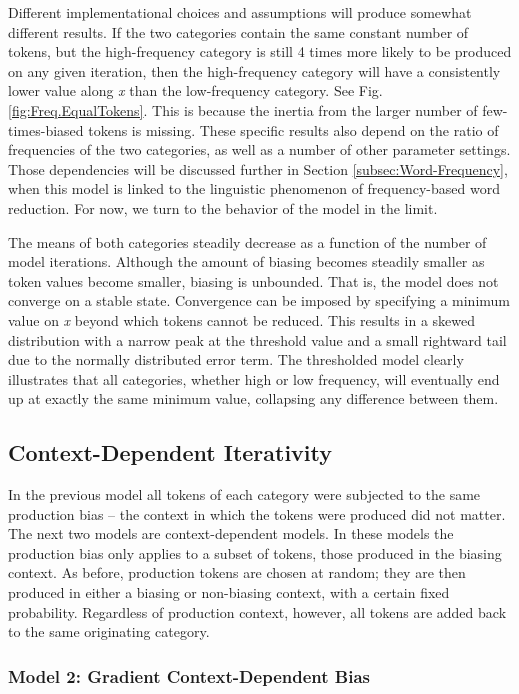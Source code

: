 Different implementational choices and assumptions will produce somewhat
different results. If the two categories contain the same constant
number of tokens, but the high-frequency category is still 4 times
more likely to be produced on any given iteration, then the high-frequency
category will have a consistently lower value along \emph{x} than
the low-frequency category. See Fig. \ref{fig:Freq.EqualTokens}.
This is because the inertia from the larger number of few-times-biased
tokens is missing. These specific results also depend on the ratio
of frequencies of the two categories, as well as a number of other
parameter settings. Those dependencies will be discussed further in
Section \ref{subsec:Word-Frequency}, when this model is linked to
the linguistic phenomenon of frequency-based word reduction. For now,
we turn to the behavior of the model in the limit.

The means of both categories steadily decrease as a function of the
number of model iterations. Although the amount of biasing becomes
steadily smaller as token values become smaller, biasing is unbounded.
That is, the model does not converge on a stable state. Convergence
can be imposed by specifying a minimum value on \emph{x} beyond which
tokens cannot be reduced. This results in a skewed distribution with
a narrow peak at the threshold value and a small rightward tail due
to the normally distributed error term. The thresholded model clearly
illustrates that all categories, whether high or low frequency, will
eventually end up at exactly the same minimum value, collapsing any
difference between them. 

\subsection{\label{sec:Context-Dependent-Iterativity}Context-Dependent Iterativity}

In the previous model all tokens of each category were subjected to
the same production bias – the context in which the tokens were produced
did not matter. The next two models are context-dependent models.
In these models the production bias only applies to a subset of tokens,
those produced in the biasing context. As before, production tokens
are chosen at random; they are then produced in either a biasing or
non-biasing context, with a certain fixed probability. Regardless
of production context, however, all tokens are added back to the same
originating category.

\subsubsection{\label{subsec:Phrase-Final Lengthening}Model 2: Gradient Context-Dependent
Bias}

